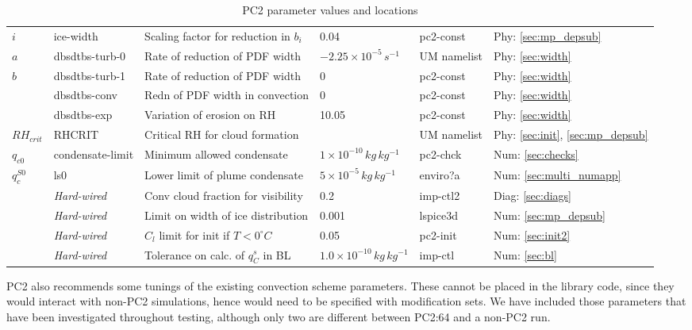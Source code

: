 \documentclass{UMDP_article}
\begin{document}
\begin{table}[ht]
\begin{center}
\begin{tabular}{llllll}
$i$         & ice-width       & Scaling factor for reduction in $b_i$ & 0.04      & pc2-const  & Phy:  \ref{sec:mp_depsub} \\
$a$         & dbsdtbs-turb-0  & Rate of reduction of PDF width        & $-2.25 \times 10^{-5} \, s^{-1}$             & UM namelist  & Phy: \ref{sec:width}    \\ 
$b$         & dbsdtbs-turb-1  & Rate of reduction of PDF width        & 0         & pc2-const  & Phy:  \ref{sec:width}     \\
            & dbsdtbs-conv    & Redn of PDF width in convection       & 0         & pc2-const  & Phy:  \ref{sec:width}     \\
            & dbsdtbs-exp     & Variation of erosion on RH            & 10.05     & pc2-const  & Phy:  \ref{sec:width}     \\
$RH_{crit}$ & RHCRIT          & Critical RH for cloud formation       &           & UM namelist  & Phy:  \ref{sec:init}, \ref{sec:mp_depsub}              \\
$q_{c0}$    & condensate-limit& Minimum allowed condensate            & $1 \times 10^{-10} \, kg \, kg^{-1}$            & pc2-chck & Num: \ref{sec:checks}   \\
$q_c^{S0}$  & ls0             & Lower limit of plume condensate       & $5 \times 10^{-5} \, kg \, kg^{-1} $            & enviro?a & Num: \ref{sec:multi_numapp}  \\
            & \textit{Hard-wired} & Conv cloud fraction for visibility& 0.2       & imp-ctl2  & Diag: \ref{sec:diags}     \\
            & \textit{Hard-wired} & Limit on width of ice distribution& 0.001     & lspice3d  & Num:  \ref{sec:mp_depsub} \\
            & \textit{Hard-wired} & $C_l$ limit for init if $T < 0 ^{\circ} C$ & 0.05                      & pc2-init & Num: \ref{sec:init2}    \\
            & \textit{Hard-wired} & Tolerance on calc. of $q_C^s$ in BL  & $1.0 \times 10^{-10} \, kg \, kg^{-1}$       & imp-ctl  & Num: \ref{sec:bl}       \\
\hline
\end{tabular}
\end{center}
\caption{PC2 parameter values and locations }
\label{tab:pc2_names}
\end{table}

PC2 also recommends some tunings of the existing convection
scheme parameters. These cannot be placed in the library code, since they
would interact with non-PC2 simulations, hence would need to be specified
with modification sets. We have included those parameters that have been
investigated throughout testing, although only two are different between
PC2:64 and a non-PC2 run.
\end{document}
